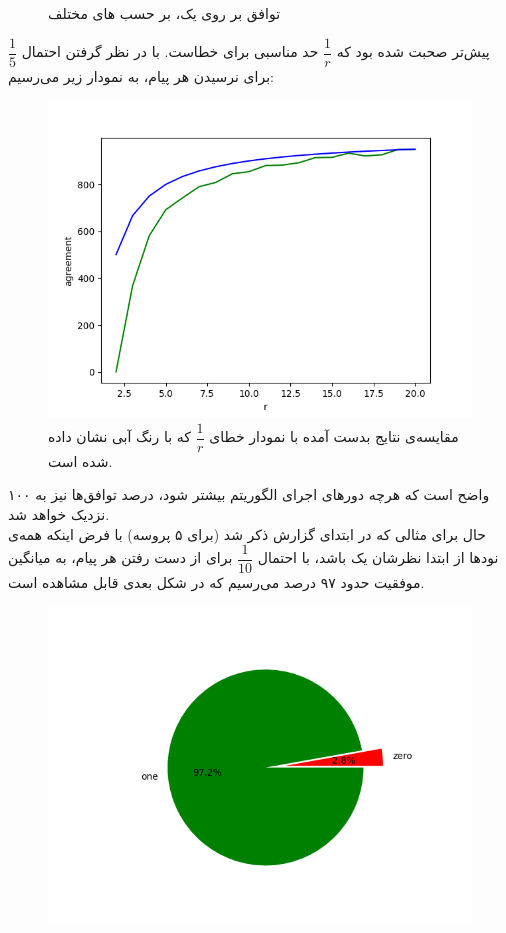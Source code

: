 \documentclass{article}
\begin{document}
\begin{multicols}{2}
\begin{figure}[H]
    \caption{
    توافق بر روی یک، بر حسب
    های مختلف
    }
    \label{fig:my_label}
\end{figure}
پیش‌تر صحبت شده بود که
$\dfrac{1}{r}$
حد مناسبی برای خطاست. با در نظر گرفتن احتمال
$\dfrac{1}{5}$
برای نرسیدن هر پیام، به نمودار زیر می‌رسیم:
\begin{figure}[H]
    \centering
    \includegraphics[width=0.99\linewidth]{Photos/HW4/one_per_r.png}
    \caption{
    مقایسه‌ی نتایج بدست آمده با نمودار خطای
    $\dfrac{1}{r}$
    که با رنگ آبی نشان داده شده است.
    }
    \label{fig:my_label}
\end{figure}
واضح است که هرچه دورهای اجرای الگوریتم بیشتر شود، درصد توافق‌ها نیز به ۱۰۰ نزدیک خواهد شد.\\
حال برای مثالی که در ابتدای گزارش ذکر شد (برای ۵ پروسه) با فرض اینکه همه‌ی نودها از ابتدا نظرشان یک باشد، با احتمال
$\dfrac{1}{10}$
برای از دست رفتن هر پیام، به میانگین موفقیت حدود ۹۷ درصد می‌رسیم که در شکل بعدی قابل مشاهده است.
\begin{figure}[H]
    \centering
    \includegraphics[width=0.99\linewidth]{Photos/HW4/percent.png}

\end{figure}
\end{multicols}
\end{document}
